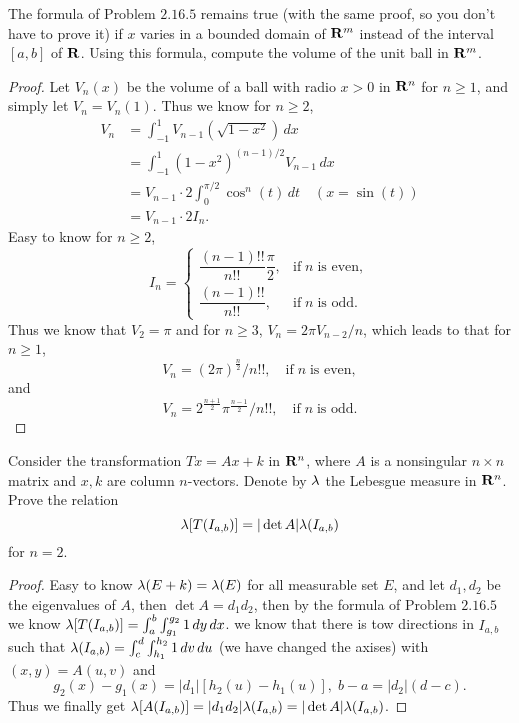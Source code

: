 \begin{pro}%
	The formula of Problem $2.16.5$ remains true (with the same proof, so you don't have to prove it) if $x$ varies in a bounded domain of $\mathbf{R}^m$ instead of the interval $[a,b]$ of $\mathbf{R}$. Using this formula, compute the volume of the unit ball in $\mathbf{R}^m$.
\end{pro}
\begin{proof}
	Let $V_n(x)$ be the volume of a ball with radio $x>0$ in $\mathbf{R}^n$ for $n\geq 1$, and simply let $V_n=V_n(1)$.
	Thus we know for $n\geq 2$,
	\begin{align*}
	V_n&=\int_{-1}^1 V_{n-1}(\sqrt{1-x^2})\,dx\\
	   &=\int_{-1}^1 (1-x^2)^{(n-1)/2}V_{n-1}\,dx\\
	   &=V_{n-1}\cdot 2\int_{0}^{\pi/2} \cos^n(t)\,dt\quad(x=\sin(t))\\
	   &=V_{n-1}\cdot 2I_n.
	\end{align*}
	Easy to know for $n\geq 2$, 
	\[I_n=\begin{cases}
	\dfrac{(n-1)!!}{n!!}\dfrac{\pi}{2},&\mbox{if}\;n\;\mbox{is even},\\
	\dfrac{(n-1)!!}{n!!},&\mbox{if}\;n\;\mbox{is odd}.\end{cases}\]
	Thus we know that $V_2=\pi$ and for $n\geq 3$, $V_n=2\pi V_{n-2}/n$, which leads to that for $n\geq 1$,
	\[V_n=(2\pi)^{\frac{n}{2}}/n!!,\quad\mbox{if}\;n\;\mbox{is even},\]
	and
	\[V_n=2^{\frac{n+1}{2}}\pi^{\frac{n-1}{2}}/n!!,\quad\mbox{if}\;n\;\mbox{is odd}.\]
\end{proof}

\begin{pro}%
	Consider the transformation $Tx=Ax+k$ in $\mathbf{R}^n$, where $A$ is a nonsingular $n\times n$ matrix and $x,k$ are column $n$-vectors. Denote by $\lambda$ the Lebesgue measure in $\mathbf{R}^n$. Prove the relation
	\[\lambda[T(I_{a,b})]=|\det A|\lambda(I_{a,b})\]
	for $n=2$.
\end{pro}
\begin{proof}
	Easy to know $\lambda(E+k)=\lambda(E)$ for all measurable set $E$, and let $d_1,d_2$ be the eigenvalues of $A$, then $\det A=d_1d_2$, then by the formula of Problem $2.16.5$ we know $\lambda[T(I_{a,b})]=\int_a^b\int_{g_1}^{g_2}1\,dy\,dx$. we know that there is tow directions in $I_{a,b}$ such that $\lambda(I_{a,b})=\int_c^d\int_{h_1}^{h_2}1\,dv\,du$ (we have changed the axises) with $(x,y)=A(u,v)$ and
	\[g_2(x)-g_1(x)=|d_1|[h_2(u)-h_1(u)],\;b-a=|d_2|(d-c).\]
	Thus we finally get $\lambda[A(I_{a,b})]=|d_1d_2|\lambda(I_{a,b})=|\det A|\lambda(I_{a,b})$.
\end{proof}

